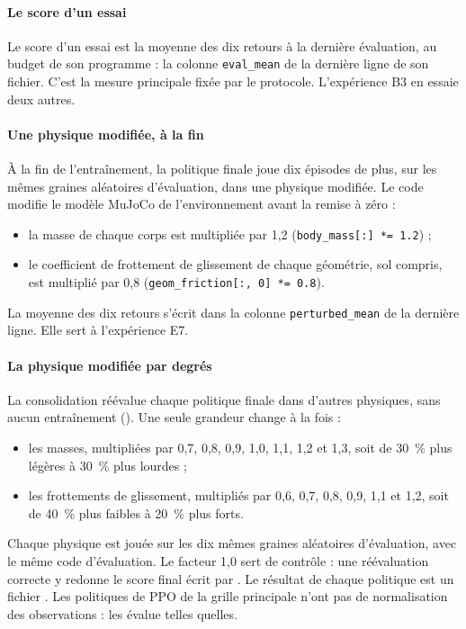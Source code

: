 \paragraph{Le score d'un essai}
Le score d'un essai est la moyenne des dix retours à la dernière évaluation, au budget de son programme : la
colonne \texttt{eval\_mean} de la dernière ligne de son fichier. C'est la mesure principale fixée par le
protocole. L'expérience B3 en essaie deux autres.

\paragraph{Une physique modifiée, à la fin}
À la fin de l'entraînement, la politique finale joue dix épisodes de plus, sur les mêmes graines aléatoires
d'évaluation, dans une physique modifiée. Le code modifie le modèle MuJoCo de l'environnement avant la remise
à zéro :
\begin{itemize}
  \item la masse de chaque corps est multipliée par 1,2 (\texttt{body\_mass[:] *= 1.2}) ;
  \item le coefficient de frottement de glissement de chaque géométrie, sol compris, est multiplié par 0,8
    (\texttt{geom\_friction[:, 0] *= 0.8}).
\end{itemize}
La moyenne des dix retours s'écrit dans la colonne \texttt{perturbed\_mean} de la dernière ligne. Elle sert à
l'expérience E7.

\paragraph{La physique modifiée par degrés}
La consolidation réévalue chaque politique finale dans d'autres physiques, sans aucun entraînement
(). Une seule grandeur change à la fois :
\begin{itemize}
  \item les masses, multipliées par 0,7, 0,8, 0,9, 1,0, 1,1, 1,2 et 1,3, soit de 30~\% plus légères à
    30~\% plus lourdes ;
  \item les frottements de glissement, multipliés par 0,6, 0,7, 0,8, 0,9, 1,1 et 1,2, soit de 40~\% plus
    faibles à 20~\% plus forts.
\end{itemize}
Chaque physique est jouée sur les dix mêmes graines aléatoires d'évaluation, avec le même code d'évaluation. Le facteur
1,0 sert de contrôle : une réévaluation correcte y redonne le score final écrit par . Le résultat de
chaque politique est un fichier \allowbreak{}\allowbreak{}\allowbreak{}. Les politiques de PPO
de la grille principale n'ont pas de normalisation des observations :  les évalue telles
quelles.

